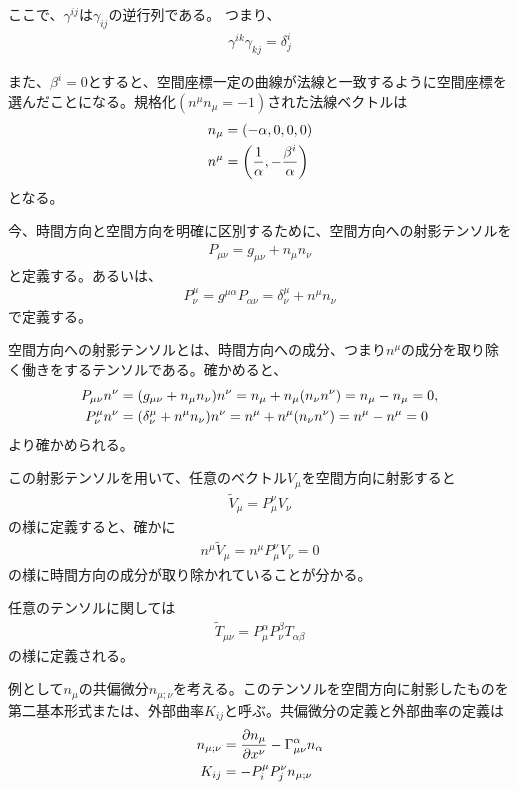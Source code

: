 \documentclass[autodetect-engine,dvi=dvipdfmx,ja=standard, 10pt, a4paper]{bxjsarticle}
\begin{document}
ここで、$\gamma^{ij}$は$\gamma_{ij}$の逆行列である。
つまり、
\begin{align}
	\gamma^{ik}\gamma_{kj} = \delta^i_j
\end{align}

また、$\beta^i =0$とすると、空間座標一定の曲線が法線と一致するように空間座標を選んだことになる。規格化$(n^\mu n_\mu=-1)$された法線ベクトルは
\begin{align}
	n_\mu &= (-\alpha, 0, 0, 0)\label{eq:nmudown}\\
  n^\mu &= \qty(\dfrac{1}{\alpha}, -\dfrac{\beta^i}{\alpha})\label{eq:nmuup}
\end{align}
となる。

今、時間方向と空間方向を明確に区別するために、空間方向への射影テンソルを
\begin{align}
	P_{\mu\nu} = g_{\mu\nu} + n_\mu n_\nu\label{1}
\end{align}
と定義する。あるいは、
\begin{align}
	P^\mu_\nu = g^{\mu\alpha}P_{\alpha\nu} = \delta^\mu_\nu + n^\mu n_\nu
\end{align}
で定義する。

空間方向への射影テンソルとは、時間方向への成分、つまり$n^\mu$の成分を取り除く働きをするテンソルである。確かめると、
\begin{align}
	P_{\mu\nu}n^\nu &= \qty(g_{\mu\nu} + n_\mu n_\nu)n^\nu = n_\mu + n_\mu (n_\nu n^\nu) = n_\mu - n_\mu = 0,\\
	P^\mu_\nu n^\nu &= \qty(\delta^\mu_\nu + n^\mu n_\nu)n^\nu = n^\mu + n^\mu (n_\nu n^\nu) = n^\mu - n^\mu = 0
\end{align}
より確かめられる。

この射影テンソルを用いて、任意のベクトル$V_\mu$を空間方向に射影すると
\begin{align}
	\tilde{V}_\mu = P_\mu^\nu V_\nu
\end{align}
の様に定義すると、確かに
\begin{align}
	n^\mu \tilde{V}_\mu = n^\mu P_\mu^\nu V_\nu = 0
\end{align}
の様に時間方向の成分が取り除かれていることが分かる。

任意のテンソルに関しては
\begin{align}
	\tilde{T}_{\mu\nu} = P_\mu^\alpha P_\nu^\beta T_{\alpha\beta}
\end{align}
の様に定義される。

例として$n_\mu$の共偏微分$n_{\mu;\nu}$を考える。このテンソルを空間方向に射影したものを第二基本形式または、外部曲率$K_{ij}$と呼ぶ。共偏微分の定義と外部曲率の定義は
\begin{align}
	n_{\mu;\nu} &= \pdv{n_\mu}{x^\nu} - \Gamma^\alpha_{\mu\nu}n_\alpha\\
	K_{ij} &= - P_i^\mu P_j^\nu n_{\mu;\nu}
\end{align}
\end{document}

